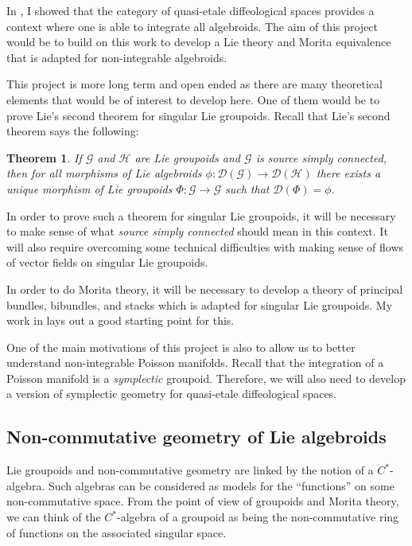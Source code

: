 \documentclass[11pt, letterpaper]{article}
\newcommand{\CG}{\mathcal{G}}
\newcommand{\CD}{\mathcal{D}}
\newcommand{\CH}{\mathcal{H}}
\newtheorem{theorem}{Theorem}
\begin{document}
In \cite{nonintegrable}, I showed that the category of quasi-etale diffeological spaces provides a context where one is able to integrate all algebroids. The aim of this project would be to build on this work to develop a Lie theory and Morita equivalence that is adapted for non-integrable algebroids.

This project is more long term and open ended as there are many theoretical elements that would be of interest to develop here. One of them would be to prove Lie's second theorem for singular Lie groupoids. Recall that Lie's second theorem says the following:
\begin{theorem}
    If \( \CG \) and \( \CH \) are Lie groupoids and \( \CG \) is source simply connected, then for all morphisms of Lie algebroids \( \phi \colon \CD(\CG) \to \CD(\CH) \) there exists a unique morphism of Lie groupoids \( \Phi \colon \CG \to \CG \) such that \( \CD(\Phi) = \phi \).
\end{theorem}
In order to prove such a theorem for singular Lie groupoids, it will be necessary to make sense of what \emph{source simply connected} should mean in this context.
It will also require overcoming some technical difficulties with making sense of flows of vector fields on singular Lie groupoids.

In order to do Morita theory, it will be necessary to develop a theory of principal bundles, bibundles, and stacks which is adapted for singular Lie groupoids.
My work in \cite{MyThesis} lays out a good starting point for this.

One of the main motivations of this project is also to allow us to better understand non-integrable Poisson manifolds. Recall that the integration of a Poisson manifold is a \emph{symplectic} groupoid. Therefore, we will also need to develop a version of symplectic geometry for quasi-etale diffeological spaces.

\subsection{Non-commutative geometry of Lie algebroids}\label{proj:noncommutative}

Lie groupoids and non-commutative geometry are linked by the notion of a \( C^*\)-algebra. Such algebras can be considered as models for the ``functions'' on some non-commutative space. 
From the point of view of groupoids and Morita theory, we can think of the \( C^*\)-algebra of a groupoid as being the non-commutative ring of functions on the associated singular space.
\end{document}
